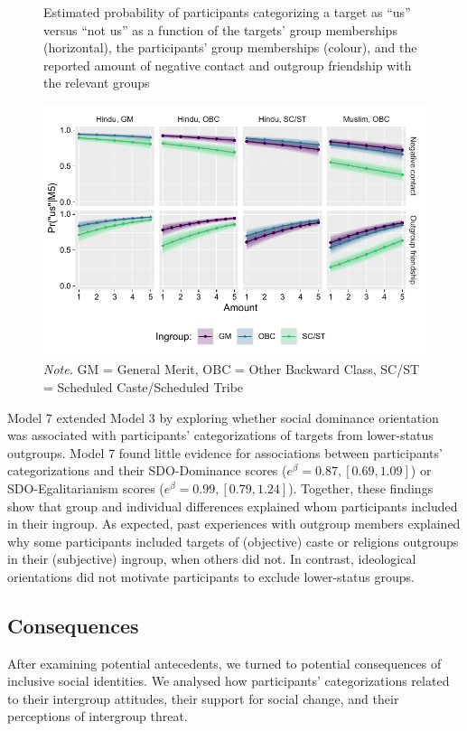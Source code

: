 \documentclass[12pt, a4paper]{article}
\begin{document}
\begin{figure}
\caption{Estimated probability of participants categorizing a target as “us” versus “not us” as a function of the targets’ group memberships (horizontal), the participants’ group memberships (colour), and the reported amount of negative contact and outgroup friendship with the relevant groups}
\centering
\includegraphics[scale=1]{../figures/figure-4}
\caption*{\textit{Note.} GM = General Merit, OBC = Other Backward Class, SC/ST = Scheduled Caste/Scheduled Tribe}
\label{fig:f4}
\end{figure}

Model 7 extended Model 3 by exploring whether social dominance orientation was associated with participants’ categorizations of targets from lower-status outgroups. Model 7 found little evidence for associations between participants’ categorizations and their SDO-Dominance scores ($e^\beta = 0.87, [0.69, 1.09]$) or SDO-Egalitarianism scores ($e^\beta = 0.99, [0.79, 1.24]$). Together, these findings show that group and individual differences explained whom participants included in their ingroup. As expected, past experiences with outgroup members explained why some participants included targets of (objective) caste or religions outgroups in their (subjective) ingroup, when others did not. In contrast, ideological orientations did not motivate participants to exclude lower-status groups.

\subsection{Consequences}

After examining potential antecedents, we turned to potential consequences of inclusive social identities. We analysed how participants’ categorizations related to their intergroup attitudes, their support for social change, and their perceptions of intergroup threat.
\end{document}
